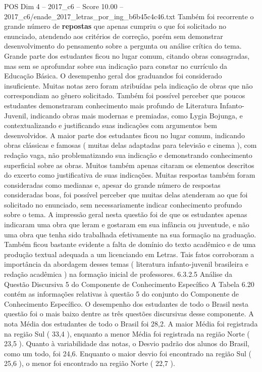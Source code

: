 \begin{textsample}{POS Dim 4 – 2017\_c6 – Score 10.00 – 2017\_c6/enade\_2017\_letras\_por\_ing\_b6b45c4c46.txt}
Também foi recorrente o grande número de \textbf{repostas} que apenas cumpriu o que foi solicitado no enunciado, atendendo aos critérios de correção, porém sem demonstrar desenvolvimento do pensamento sobre a pergunta ou análise crítica do tema.
Grande parte dos estudantes ficou no lugar comum, citando obras consagradas, mas sem se aprofundar sobre sua indicação para constar no currículo da Educação Básica.
O desempenho geral dos graduandos foi considerado insuficiente.
Muitas notas zero foram atribuídas pela indicação de obras que não correspondiam ao gênero solicitado.
Também foi possível perceber que poucos estudantes demonstraram conhecimento mais profundo de Literatura Infanto-Juvenil, indicando obras mais modernas e premiadas, como Lygia Bojunga, e contextualizando e justificando suas indicações com argumentos bem desenvolvidos.
A maior parte dos estudantes ficou no lugar comum, indicando obras clássicas e famosas ( muitas delas adaptadas para televisão e cinema ), com redação vaga, não problematizando sua indicação e demonstrando conhecimento superficial sobre as obras.
Muitos também apenas citaram os elementos descritos do excerto como justificativa de suas indicações.
Muitas respostas também foram consideradas como medianas e, apesar do grande número de respostas consideradas boas, foi possível perceber que muitas delas atenderam ao que foi solicitado no enunciado, sem necessariamente indicar conhecimento profundo sobre o tema.
A impressão geral nesta questão foi de que os estudantes apenas indicaram uma obra que leram e gostaram em sua infância ou juventude, e não uma obra que tenha sido trabalhada efetivamente na sua formação na graduação.
Também ficou bastante evidente a falta de domínio do texto acadêmico e de uma produção textual adequada a um licenciando em Letras.
Tais fatos corroboram a importância da abordagem desses temas ( literatura infanto-juvenil brasileira e redação acadêmica ) na formação inicial de professores. 6.3.2.5 Análise da Questão Discursiva 5 do Componente de Conhecimento Específico A Tabela 6.20 contém as informações relativas à questão 5 do conjunto do Componente de Conhecimento Específico.
O desempenho dos estudantes de todo o Brasil nesta questão foi o mais baixo dentre as três questões discursivas desse componente.
A nota Média dos estudantes de todo o Brasil foi 28,2.
A maior Média foi registrada na região Sul ( 33,4 ), enquanto a menor Média foi registrada na região Norte ( 23,5 ).
Quanto à variabilidade das notas, o Desvio padrão dos alunos do Brasil, como um todo, foi 24,6.
Enquanto o maior desvio foi encontrado na região Sul ( 25,6 ), o menor foi encontrado na região Norte ( 22,7 ).

\end{textsample}
